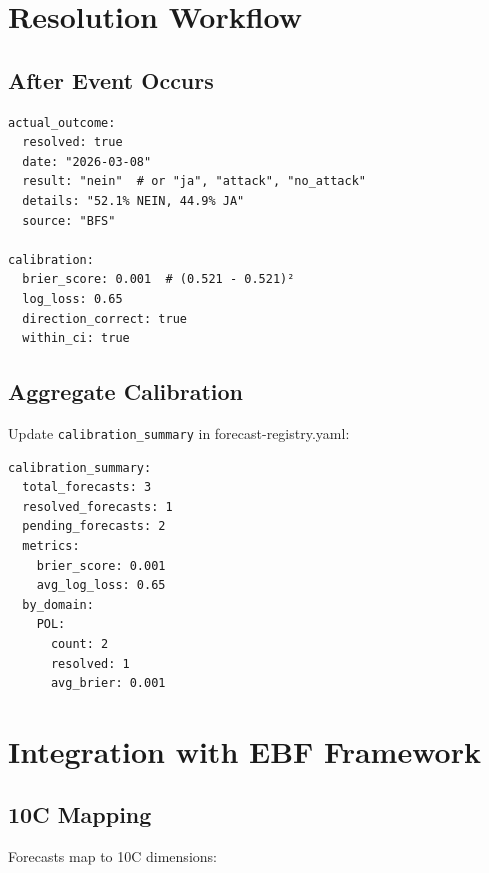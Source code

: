 \section{Resolution Workflow}
\label{sec:fct-resolution}

\subsection{After Event Occurs}

\begin{verbatim}
actual_outcome:
  resolved: true
  date: "2026-03-08"
  result: "nein"  # or "ja", "attack", "no_attack"
  details: "52.1% NEIN, 44.9% JA"
  source: "BFS"

calibration:
  brier_score: 0.001  # (0.521 - 0.521)²
  log_loss: 0.65
  direction_correct: true
  within_ci: true
\end{verbatim}

\subsection{Aggregate Calibration}

Update \texttt{calibration\_summary} in forecast-registry.yaml:

\begin{verbatim}
calibration_summary:
  total_forecasts: 3
  resolved_forecasts: 1
  pending_forecasts: 2
  metrics:
    brier_score: 0.001
    avg_log_loss: 0.65
  by_domain:
    POL:
      count: 2
      resolved: 1
      avg_brier: 0.001
\end{verbatim}

\section{Integration with EBF Framework}
\label{sec:fct-ebf}

\subsection{10C Mapping}

Forecasts map to 10C dimensions:

